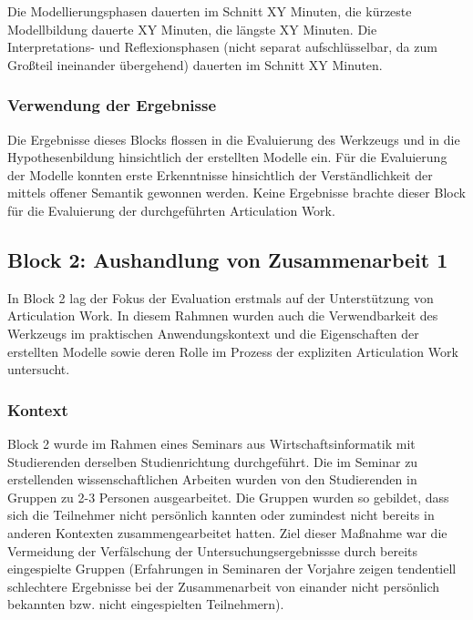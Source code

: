 Die Modellierungsphasen dauerten im Schnitt XY Minuten, die kürzeste Modellbildung dauerte XY Minuten, die längste XY Minuten. Die Interpretations- und Reflexionsphasen (nicht separat aufschlüsselbar, da zum Großteil ineinander übergehend) dauerten im Schnitt XY Minuten. 


\subsubsection{Verwendung der Ergebnisse} %
\label{ssub:1_verwendung_der_ergebnisse}

Die Ergebnisse dieses Blocks flossen in die Evaluierung des Werkzeugs und in die Hypothesenbildung hinsichtlich der erstellten Modelle ein. Für die Evaluierung der Modelle konnten erste Erkenntnisse hinsichtlich der Verständlichkeit der mittels offener Semantik gewonnen werden. Keine Ergebnisse brachte dieser Block für die Evaluierung der durchgeführten Articulation Work.


\subsection{Block 2: Aushandlung von Zusammenarbeit 1}
\label{sub:eval_2}

In Block 2 lag der Fokus der Evaluation erstmals auf der Unterstützung von Articulation Work. In diesem Rahmnen wurden auch die Verwendbarkeit des Werkzeugs im praktischen Anwendungskontext und die Eigenschaften der erstellten Modelle sowie deren Rolle im Prozess der expliziten Articulation Work untersucht.

\subsubsection{Kontext} %
\label{ssub:2_kontext}

Block 2 wurde im Rahmen eines Seminars aus Wirtschaftsinformatik mit Studierenden derselben Studienrichtung durchgeführt. Die im Seminar zu erstellenden wissenschaftlichen Arbeiten wurden von den Studierenden in Gruppen zu 2-3 Personen ausgearbeitet. Die Gruppen wurden so gebildet, dass sich die Teilnehmer nicht persönlich kannten oder zumindest nicht bereits in anderen Kontexten zusammengearbeitet hatten. Ziel dieser Maßnahme war die Vermeidung der Verfälschung der Untersuchungsergebnissse durch bereits eingespielte Gruppen (Erfahrungen in Seminaren der Vorjahre zeigen tendentiell schlechtere Ergebnisse bei der Zusammenarbeit von einander nicht persönlich bekannten bzw. nicht eingespielten Teilnehmern).


